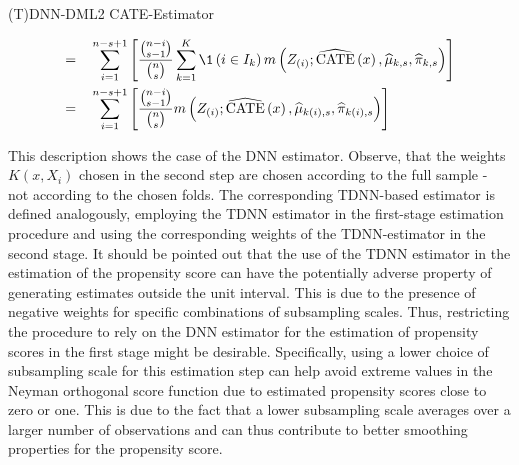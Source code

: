 \begin{boxD}
\begin{dfn}{(T)DNN-DML2 CATE-Estimator}
\begin{enumerate}
\begin{equation}
\begin{aligned}
					      = \quad         & \sum_{i = 1}^{n - s + 1} \left[\frac{\binom{n-i}{s-1}}{\binom{n}{s}} \sum_{k = 1}^{K} \1\left(i \in I_{k}\right)  m\left(Z_{(i)}; \widehat{\operatorname{CATE}}\left(x\right), \hat{\mu}_{k,s}, \hat{\pi}_{k,s}\right)\right] \\
					      = \quad         & \sum_{i = 1}^{n - s + 1} \left[\frac{\binom{n-i}{s-1}}{\binom{n}{s}} m\left(Z_{(i)}; \widehat{\operatorname{CATE}}\left(x\right), \hat{\mu}_{k(i),s}, \hat{\pi}_{k(i),s}\right)\right]
				      \end{aligned}
			      \end{equation}
		\end{enumerate}
	\end{dfn}
\end{boxD}
This description shows the case of the DNN estimator.
Observe, that the weights $K(x, X_{i})$ chosen in the second step are chosen according to the full sample - not according to the chosen folds.
The corresponding TDNN-based estimator is defined analogously, employing the TDNN estimator in the first-stage estimation procedure and using the corresponding weights of the TDNN-estimator in the second stage.
It should be pointed out that the use of the TDNN estimator in the estimation of the propensity score can have the potentially adverse property of generating estimates outside the unit interval.
This is due to the presence of negative weights for specific combinations of subsampling scales.
Thus, restricting the procedure to rely on the DNN estimator for the estimation of propensity scores in the first stage might be desirable.
Specifically, using a lower choice of subsampling scale for this estimation step can help avoid extreme values in the Neyman orthogonal score function due to estimated propensity scores close to zero or one.
This is due to the fact that a lower subsampling scale averages over a larger number of observations and can thus contribute to better smoothing properties for the propensity score.


